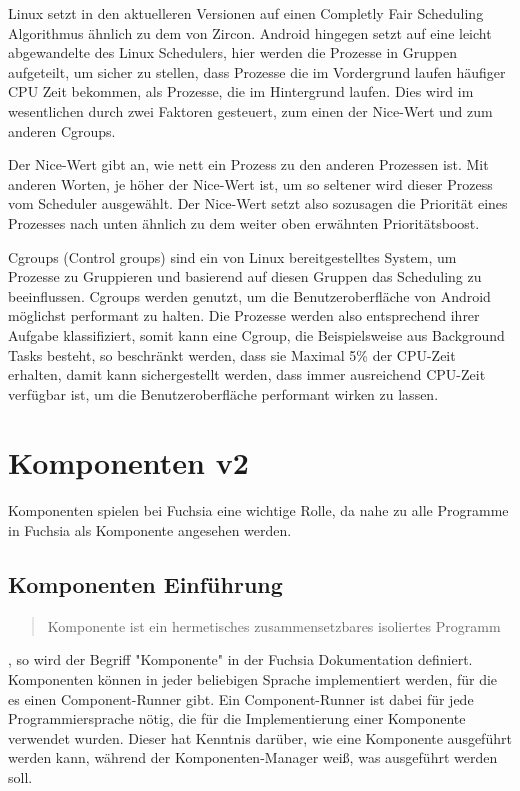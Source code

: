 \documentclass[a4paper]{scrartcl}
\begin{document}
Linux setzt in den aktuelleren Versionen auf einen Completly Fair Scheduling Algorithmus ähnlich zu dem von Zircon. Android hingegen setzt auf eine leicht abgewandelte des Linux Schedulers, hier werden die Prozesse in Gruppen aufgeteilt, um sicher zu stellen, dass Prozesse die im Vordergrund laufen häufiger CPU Zeit bekommen, als Prozesse, die im Hintergrund laufen. Dies wird im wesentlichen durch zwei Faktoren gesteuert, zum einen der Nice-Wert und zum anderen Cgroups.

Der Nice-Wert gibt an, wie nett ein Prozess zu den anderen Prozessen ist. Mit anderen Worten, je höher der Nice-Wert ist, um so seltener wird dieser Prozess vom Scheduler ausgewählt. Der Nice-Wert setzt also sozusagen die Priorität eines Prozesses nach unten ähnlich zu dem weiter oben erwähnten Prioritätsboost.

Cgroups (Control groups) sind ein von Linux bereitgestelltes System, um Prozesse zu Gruppieren und basierend auf diesen Gruppen das Scheduling zu beeinflussen. Cgroups werden genutzt, um die Benutzeroberfläche von Android möglichst performant zu halten. Die Prozesse werden also entsprechend ihrer Aufgabe klassifiziert, somit kann eine Cgroup, die Beispielsweise aus Background Tasks besteht, so beschränkt werden, dass sie Maximal 5\% der CPU-Zeit erhalten, damit kann sichergestellt werden, dass immer ausreichend CPU-Zeit verfügbar ist, um die Benutzeroberfläche performant wirken zu lassen.
\section{Komponenten v2}
Komponenten spielen bei Fuchsia eine wichtige Rolle, da nahe zu alle Programme in Fuchsia als Komponente angesehen werden.
\subsection{Komponenten Einführung}
\begin{quote}
Komponente ist ein hermetisches zusammensetzbares isoliertes Programm
\end{quote} \cite{FuCHSIADOCS}, so wird der Begriff "Komponente" in der Fuchsia Dokumentation definiert. Komponenten können in jeder beliebigen Sprache implementiert werden, für die es einen Component-Runner gibt. Ein Component-Runner ist dabei für jede Programmiersprache nötig, die für die Implementierung einer Komponente verwendet wurden. Dieser hat Kenntnis darüber, wie eine Komponente ausgeführt werden kann, während der Komponenten-Manager weiß, was ausgeführt werden soll.
\end{document}
